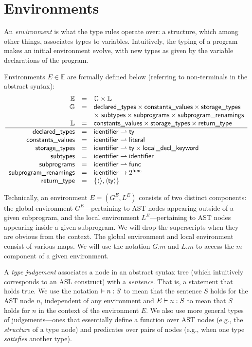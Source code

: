 \documentclass{book}
\begin{document}
\section{Environments}

An \emph{environment} is what the type rules operate over: a structure, which among
other things, associates types to variables. Intuitively, the typing of a
program makes an initial environment evolve, with new types as given by the
variable declarations of the program.

Environments $E \in \mathbb{E}$ are formally defined below (referring to non-terminals in the abstract syntax):
\[
\begin{array}{rcl}
\mathbb{E} 	&=& \mathbb{G} \times \mathbb{L}\\
\mathbb{G} 	&=& \textsf{declared\_types} \times \textsf{constants\_values} \times \textsf{storage\_types}\\
  			& & \times\ \textsf{subtypes} \times \textsf{subprograms} \times \textsf{subprogram\_renamings}\\
\mathbb{L} 	&=& \textsf{constants\_values} \times \textsf{storage\_types} \times \textsf{return\_type}\\
\hline
\textsf{declared\_types}	 &=& \textsf{identifier} \rightharpoonup \textsf{ty}\\
\textsf{constants\_values} &=& \textsf{identifier} \rightharpoonup \textsf{literal}\\
\textsf{storage\_types}    &=& \textsf{identifier} \rightharpoonup \textsf{ty} \times \textsf{local\_decl\_keyword}\\
\textsf{subtypes}		 &=& \textsf{identifier} \rightharpoonup \textsf{identifier}\\
\textsf{subprograms}	 &=& \textsf{identifier} \rightharpoonup \textsf{func}\\
\textsf{subprogram\_renamings}	 &=& \textsf{identifier} \rightarrow 2^{\textsf{func}}\\
\textsf{return\_type}      &=& \{\langle\rangle, \langle \textsf{ty} \rangle\}
\end{array}
\]

Technically, an environment $E=(G^E, L^E)$ consists of two
distinct components: the global environment $G^E$---pertaining to AST nodes
appearing outside of a given subprogram, and the local environment
$L^E$---pertaining to AST nodes appearing inside a given subprogram.
%
We will drop the superscripts when they are obvious from the context.
%
The global environment and local environment consist of various maps. We will use the notation $G.m$ and $L.m$ to access the $m$ component of a given environment.


A \emph{type judgement} associates a node in an abstract syntax tree (which
intuitively corresponds to an ASL construct) with a \emph{sentence}. That is, a statement that holds true.
%
We use the notation $\vdash n : S$ to mean that the sentence $S$ holds for the AST node $n$, independent of any environment and $E \vdash n : S$ to mean that $S$ holds for $n$ in the context of the environment $E$.
%
We also use more general types of judgements---ones that essentially define a function over AST nodes (e.g., the \emph{structure} of a type node) and predicates over pairs of nodes (e.g., when one type \emph{satisfies} another type).
\end{document}
